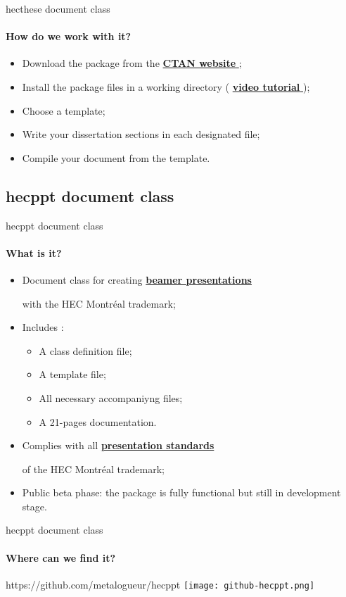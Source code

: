 \documentclass[aspectratio=1610,compress,t,gabaritb,french,english]{hecppt}
\newcommand{\HEClien}[2]{%
	\href{#1}{\textbf{#2} \faExternalLink}
}
\begin{document}
		\begin{frame}[c]{hecthese document class}
			\framesubtitle{How do we work with it?}
			\begin{itemize}
				\item Download the package from the \HEClien{https://ctan.org/pkg/hecthese}{CTAN website};
				\item Install the package files in a working directory
					(\HEClien{https://www.youtube.com/watch?v=nfTEgcJbufs}{video tutorial});
				\item Choose a template;
				\item Write your dissertation sections in each designated file;
				\item Compile your document from the template.
			\end{itemize}
		\end{frame}

	\subsection{hecppt document class}
	
		\begin{frame}{hecppt document class}
			\framesubtitle{What is it?}
			
			\begin{itemize}
				\item Document class for creating \HEClien{https://ctan.org/pkg/beamer}{beamer presentations}
					with the HEC Montréal trademark;
				\item Includes :
				\begin{itemize}
					\item A class definition file;
					\item A template file;
					\item All necessary accompaniyng files;
					\item A 21-pages documentation.
				\end{itemize}
				\item Complies with all \HEClien{http://marque.hec.ca/}{presentation standards}
					of the HEC Montréal trademark;
				\item Public beta phase: the package is fully functional but still in development stage.
			\end{itemize}
		\end{frame}
		
		\begin{frame}{hecppt document class}
			\framesubtitle{Where can we find it?}
			
			\begin{HECimagesstitre}{\centering https://github.com/metalogueur/hecppt}
				\texttt{[image: github-hecppt.png]}
			\end{HECimagesstitre}
		
		\end{frame}
		
\end{document}
